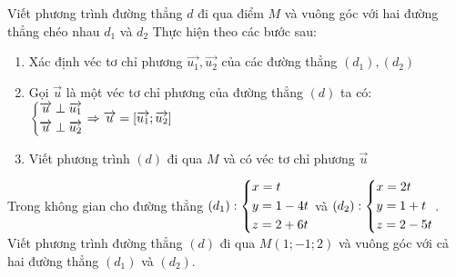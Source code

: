 \begin{dang}{Viết phương trình đường thẳng $d$ đi qua điểm $M$ và vuông góc với hai đường thẳng chéo nhau $d_1$ và $d_2$}
Thực hiện theo các bước sau:
\begin{enumerate}
\item Xác định véc tơ chỉ phương $\vec{u_1},\vec{u_2}$ của các đường thẳng $(d_1),(d_2)$
\item Gọi $\vec{u}$ là một véc tơ chỉ phương của đường thẳng $(d)$ ta có: \\
$\left\{\begin{aligned}&\protect\overrightarrow{u}\perp \protect\overrightarrow{u_1}\\&\protect\overrightarrow{u}\perp \protect\overrightarrow{u_2}\end{aligned}\right.\Rightarrow \protect\overrightarrow{u}=\left[\protect\overrightarrow{u_1};\protect\overrightarrow{u_2}\right]$
\item Viết phương trình $(d)$ đi qua $M$ và có véc tơ chỉ phương $\vec{u}$
\end{enumerate}
\end{dang}
\begin{vd}%
	Trong không gian cho đường thẳng $(d_1):\left\{\begin{aligned}&x=t\\&y=1-4t\\&z=2+6t\end{aligned}\right.$ và $(d_2):\left\{\begin{aligned}&x=2t\\&y=1+t\\&z=2-5t\end{aligned}\right.$.\\
	Viết phương trình đường thẳng $(d)$ đi qua $M(1;-1;2)$ và vuông góc với cả hai đường thẳng $(d_1)$ và $(d_2)$.
\end{vd}
